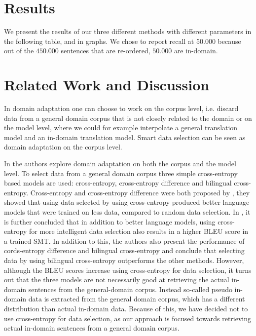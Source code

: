 \documentclass[11pt]{article}
\begin{document}
\section{Results}
\label{sec:results}
We present the results of our three different methods with different parameters in the following table, and in graphs. We chose to report recall at $50.000$ because out of the $450.000$ sentences that are re-ordered, $50.000$ are in-domain. 


\section{Related Work and Discussion}
\label{sec:related}
In domain adaptation one can choose to work on the corpus level, i.e. discard data from a general domain corpus that is not closely related to the domain or on the model level, where we could for example interpolate a general translation model and an in-domain translation model. Smart data selection can be seen as domain adaptation on the corpus level. 

In \cite{pseudo} the authors explore domain adaptation on both the corpus and the model level. To select data from a general domain corpus three simple cross-entropy based models are used: cross-entropy, cross-entropy difference and bilingual cross-entropy. Cross-entropy and cross-entropy difference were both proposed by \cite{intelligent}, they showed that using data selected by using cross-entropy produced better language models that were trained on less data, compared to random data selection. In \cite{pseudo}, it is further concluded that in addition to better language models, using cross-entropy for more intelligent data selection also results in a higher BLEU score in a trained SMT. In addition to this, the authors also present the performance of cords-entropy difference and bilingual cross-entropy and conclude that selecting data by using bilingual cross-entropy outperforms the other methods. However, although the BLEU scores increase using cross-entropy for data selection, it turns out that the three models are not necessarily good at retrieving the actual in-domain sentences from the general-domain corpus. Instead so-called pseudo in-domain data is extracted from the general domain corpus, which has a different distribution than actual in-domain data. Because of this, we have decided not to use cross-entropy for data selection, as our approach is focused towards retrieving actual in-domain sentences from a general domain corpus.
\end{document}
